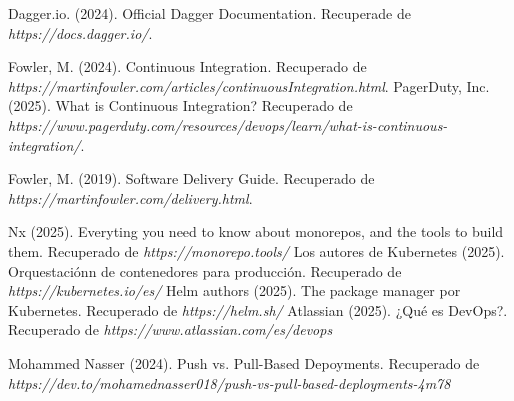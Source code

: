 

\begin{thebibliography}{99}
 Dagger.io. (2024). Official Dagger Documentation. Recuperade de {\it https://docs.dagger.io/}.

 Fowler, M. (2024). Continuous Integration. Recuperado de {\it https://martinfowler.com/articles/continuousIntegration.html}.
 PagerDuty, Inc. (2025). What is Continuous Integration? Recuperado de {\it https://www.pagerduty.com/resources/devops/learn/what-is-continuous-integration/}.

 Fowler, M. (2019). Software Delivery Guide. Recuperado de {\it https://martinfowler.com/delivery.html}.

 Nx (2025). Everyting you need to know about monorepos, and the tools to build them. Recuperado de {\it https://monorepo.tools/}
 Los autores de Kubernetes (2025). Orquestaciónn de contenedores para producción. Recuperado de {\it https://kubernetes.io/es/}
 Helm authors (2025). The package manager por Kubernetes. Recuperado de {\it https://helm.sh/}
 Atlassian (2025). ¿Qué es DevOps?. Recuperado de {\it https://www.atlassian.com/es/devops}

 Mohammed Nasser (2024). Push vs. Pull-Based Depoyments. Recuperado de {\it https://dev.to/mohamednasser018/push-vs-pull-based-deployments-4m78}




\end{thebibliography}

